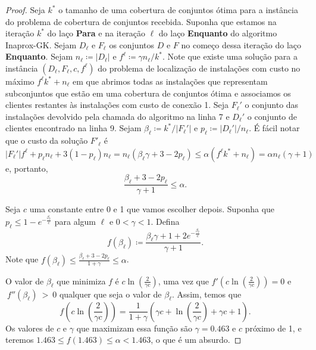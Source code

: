 \begin{proof}
Seja $k^*$ o tamanho de uma cobertura de conjuntos ótima para a instância do problema de cobertura de conjuntos recebida. Suponha que estamos na iteração $k^*$ do laço {\bf Para} e na iteração $\ell$ do laço {\bf Enquanto} do algoritmo {\sc Inaprox-GK}.
Sejam $D_\ell$ e $F_\ell$ os conjuntos $D$ e $F$ no começo dessa iteração do laço {\bf Enquanto}. Sejam $n_\ell \coloneqq |D_\ell|$ e $f^\ell \coloneqq \gamma n_\ell /k^*$. Note que existe uma solução para a instância $(D_\ell,F_\ell,c,f^\ell)$ do problema de localização de instalações com custo no máximo $f^\ell k^* + n_\ell$ em que abrimos todas as instalações que representam subconjuntos que estão em uma cobertura de conjuntos ótima e associamos os clientes restantes às instalações com custo de conexão 1.
Seja $F_\ell'$ o conjunto das instalações devolvido pela chamada do algoritmo na linha 7 e $D_\ell'$ o conjunto de clientes encontrado na linha 9. Sejam $\beta_\ell \coloneqq k^*/|F_\ell'|$ e $p_\ell \coloneqq |D_\ell'|/n_\ell $. É fácil notar que o custo da solução $F'_\ell$ é
\[ |F_\ell'| f^\ell+ p_\ell n_\ell + 3 (1-p_\ell) n_\ell = n_\ell(\beta_\ell \gamma + 3 - 2p_\ell) \leq \alpha ( f^\ell k^* + n_\ell) = \alpha n_\ell (\gamma + 1)\]
e, portanto, 
\begin{equation} 
    \label{inaprox:beta}
\frac{\beta_\ell + 3 - 2p_\ell}{\gamma + 1} \leq \alpha.
\end{equation}

Seja $c$ uma constante entre 0 e 1 que vamos escolher depois. Suponha que $p_\ell \leq 1 - e^{-\frac{\beta_\ell}{c}}$ para algum $\ell$ e $0 < \gamma < 1$. Defina 
\[f(\beta_\ell) \coloneqq \frac{\beta_\ell \gamma + 1 + 2e^{-\frac{\beta_\ell}{c}}}{\gamma + 1}.\]
Note que $f(\beta_\ell) \leq \frac{\beta_\ell + 3 - 2p_\ell}{1 + \gamma} \leq \alpha$.

O valor de $\beta_\ell$ que minimiza $f$ é $c\ln(\frac{2}{\gamma c})$, uma vez que $f'(c\ln(\frac{2}{\gamma c})) = 0$ e $~f''(\beta_\ell)~>~0$ qualquer que seja o valor de $\beta_\ell$. Assim, temos que 
\[f(c\ln\left(\frac{2}{\gamma c}\right)) = \frac{1}{1+\gamma} \left( \gamma c + \ln\left(\frac{2}{\gamma c}\right) + \gamma c + 1 \right).\]
Os valores de $c$ e $\gamma$ que maximizam essa função são $\gamma = 0.463$ e $c$ próximo de 1, e teremos $1.463 \leq f(1.463) \leq \alpha < 1.463$, o que é um absurdo.


\end{proof}
